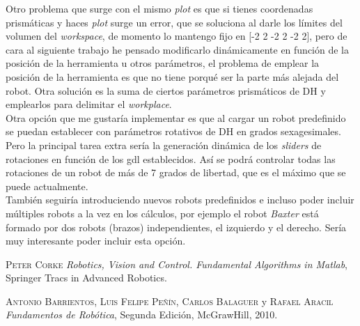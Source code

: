 \documentclass[a4paper, fontsize=11pt]{scrartcl} %
\numberwithin{equation}{section} %
\numberwithin{figure}{section} %
\numberwithin{table}{section} %
\begin{document}
	Otro problema que surge con el mismo \textit{plot} es que si tienes coordenadas prismáticas y haces \textit{plot} surge un error, que se soluciona al darle los límites del volumen del \textit{workspace}, de momento lo mantengo fijo en [-2 2 -2 2 -2 2], pero de cara al siguiente trabajo he pensado modificarlo dinámicamente en función de la posición de la herramienta u otros parámetros, el problema de emplear la posición de la herramienta es que no tiene porqué ser la parte más alejada del robot. Otra solución es la suma de ciertos parámetros prismáticos de DH y emplearlos para delimitar el \textit{workplace}.\\
	
	Otra opción que me gustaría implementar es que al cargar un robot predefinido se puedan establecer con parámetros rotativos de DH en grados sexagesimales.\\
	
	Pero la principal tarea extra sería la generación dinámica de los \textit{sliders} de rotaciones en función de los gdl establecidos. Así se podrá controlar todas las rotaciones de un robot de más de 7 grados de libertad, que es el máximo que se puede actualmente.\\

	También seguiría introduciendo nuevos robots predefinidos e incluso poder incluir múltiples robots a la vez en los cálculos, por ejemplo el robot \textit{Baxter} está formado por dos robots (brazos) independientes, el izquierdo y el derecho. Sería muy interesante poder incluir esta opción.\\
	
	 
	
	\begin{thebibliography}{X}
		
		 \textsc{Peter Corke} \textit{Robotics, Vision and Control. Fundamental Algorithms in Matlab}, Springer Tracs in Advanced Robotics.
		
		 \textsc{Antonio Barrientos, Luis Felipe Peñín, Carlos Balaguer} y \textsc{Rafael Aracil} \textit{Fundamentos de Robótica}, Segunda Edición, McGrawHill, 2010.
		
	\end{thebibliography}
	
\end{document}
